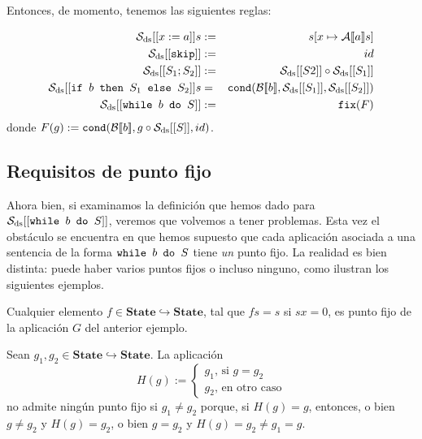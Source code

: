 Entonces, de momento, tenemos las siguientes reglas: 

\begin{sist*}
\begin{eqnarray*}
    \mathcal{S}_{\mathrm{ds}} [[x:=a]]s &:=& s[x\mapsto \mathcal{A}[\![a]\!]s] \\
    \mathcal{S}_{\mathrm{ds}} [[\texttt{skip}]] &:=& id \\
    \mathcal{S}_{\mathrm{ds}} [[S_1;S_2]] &:=& \mathcal{S}_{\mathrm{ds}} [[S2]] \circ \mathcal{S}_{\mathrm{ds}} [[S_1]] \\
    \mathcal{S}_{\mathrm{ds}} [[\texttt{if } b\texttt{ then } S_1\texttt{ else } S_2]]s &=&  \texttt{cond}(\mathcal{B}[\![b]\!], \mathcal{S}_{\mathrm{ds}} [[S_1]], \mathcal{S}_{\mathrm{ds}} [[S_2]])\\
    \mathcal{S}_{\mathrm{ds}} [[\texttt{while } b \texttt{ do } S]] &:=&  \texttt{fix}(F)\\
\end{eqnarray*}
donde $F(g) := \texttt{cond}(\mathcal{B}[\![b]\!], g\circ \mathcal{S}_{\mathrm{ds}}[[S]], id)$.
\end{sist*}

\subsection{Requisitos de punto fijo}

Ahora bien, si examinamos la definición que hemos dado para $\mathcal{S}_{\mathrm{ds}} [[\texttt{while } b \texttt{ do } S]]$, veremos que volvemos a tener problemas. Esta vez el obstáculo se encuentra en que hemos supuesto que cada aplicación asociada a una sentencia de la forma $\texttt{while } b \texttt{ do } S$ tiene \textit{un} punto fijo. La realidad es bien distinta: puede haber varios puntos fijos o incluso ninguno, como ilustran los siguientes ejemplos.

\begin{example}
Cualquier elemento $f \in  \mathbf{State}\hookrightarrow \mathbf{State}$, tal que $fs =s$ si $sx = 0$, es punto fijo de la aplicación $G$ del anterior ejemplo.
\end{example}

\begin{example}
Sean $g_1, g_2 \in \mathbf{State}\hookrightarrow\mathbf{State}$. La aplicación 
$$H(g) := \begin{cases}
     g_1 \text{, si } g = g_2\\
     g_2 \text{, en otro caso}
\end{cases}$$
no admite ningún punto fijo si $g_1 \neq g_2$ porque, si $H(g) = g$, entonces, o bien $g \neq g_2$ y $H(g)= g_2$, o bien $g = g_2$ y $H(g)= g_2 \neq g_1=g$.
\end{example}

